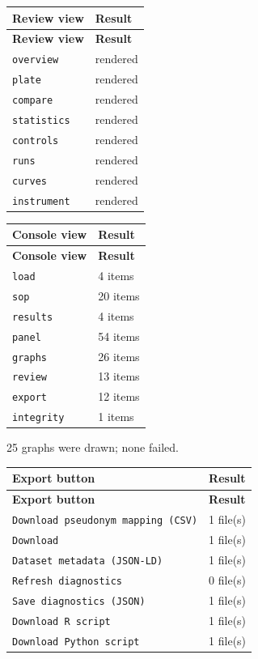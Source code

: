 {\small
\begin{xltabular}{\linewidth}{|X|l|}
\toprule \textbf{Review view} & \textbf{Result} \\\midrule\endfirsthead
\toprule \textbf{Review view} & \textbf{Result} \\\midrule\endhead
\texttt{overview} & rendered \\
\texttt{plate} & rendered \\
\texttt{compare} & rendered \\
\texttt{statistics} & rendered \\
\texttt{controls} & rendered \\
\texttt{runs} & rendered \\
\texttt{curves} & rendered \\
\texttt{instrument} & rendered \\
\bottomrule
\end{xltabular}}

{\small
\begin{xltabular}{\linewidth}{|X|l|}
\toprule \textbf{Console view} & \textbf{Result} \\\midrule\endfirsthead
\toprule \textbf{Console view} & \textbf{Result} \\\midrule\endhead
\texttt{load} & 4 items \\
\texttt{sop} & 20 items \\
\texttt{results} & 4 items \\
\texttt{panel} & 54 items \\
\texttt{graphs} & 26 items \\
\texttt{review} & 13 items \\
\texttt{export} & 12 items \\
\texttt{integrity} & 1 items \\
\bottomrule
\end{xltabular}}

25 graphs were drawn; none failed.\par

{\small
\begin{xltabular}{\linewidth}{|X|l|}
\toprule \textbf{Export button} & \textbf{Result} \\\midrule\endfirsthead
\toprule \textbf{Export button} & \textbf{Result} \\\midrule\endhead
\texttt{Download pseudonym mapping (CSV)} & 1 file(s) \\
\texttt{Download} & 1 file(s) \\
\texttt{Dataset metadata (JSON-LD)} & 1 file(s) \\
\texttt{Refresh diagnostics} & 0 file(s) \\
\texttt{Save diagnostics (JSON)} & 1 file(s) \\
\texttt{Download R script} & 1 file(s) \\
\texttt{Download Python script} & 1 file(s) \\
\bottomrule
\end{xltabular}}

